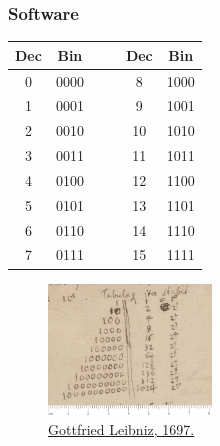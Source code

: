 \documentclass{beamer}
\begin{document}
\begin{frame}[fragile]\frametitle{Software}

\begin{minipage}{5cm}
\begin{tabular}{c|c| c c |c|c}
Dec& Bin  & & & Dec& Bin\\ \hline
0	& 0000 & & & 8	& 1000 \\
1	& 0001 & & & 9	& 1001 \\
2	& 0010 & & & 10	& 1010 \\
3	& 0011 & & & 11	& 1011 \\
4	& 0100 & & & 12	& 1100 \\
5	& 0101 & & & 13	& 1101 \\
6	& 0110 & & & 14	& 1110 \\
7	& 0111 & & & 15	& 1111
\end{tabular}
\end{minipage}
\hfill
\begin{minipage}{5cm}
\begin{figure}
\includegraphics[height=3.5cm]{figs/Leibniz_binary_system_1697.jpg}
\caption{\href{https://es.wikipedia.org/wiki/Gottfried_Leibniz}{Gottfried Leibniz, 1697.}}
\end{figure}
\end{minipage}
\end{frame}
\end{document}
